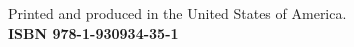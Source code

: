 \begin{minipage}[t][1.0cm][b]{\textwidth}
\begin{center}
Printed and produced in the United States of America.\\
\bf{ISBN 978-1-930934-35-1}
\end{center}
\end{minipage}

